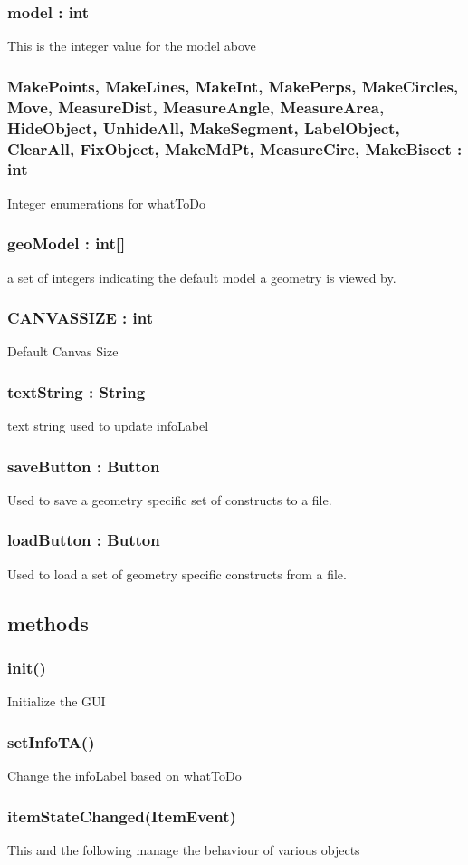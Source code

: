 \documentclass[a4paper,10pt]{report}
\begin{document}
\subsubsection{model : int} This is the integer value for the model above
\subsubsection{MakePoints, MakeLines, MakeInt, MakePerps, MakeCircles, Move, MeasureDist, MeasureAngle, MeasureArea, HideObject, UnhideAll, MakeSegment, LabelObject, ClearAll, FixObject, MakeMdPt, MeasureCirc, MakeBisect : int}
Integer enumerations for whatToDo
\subsubsection{geoModel : int[]} a set of integers indicating the default model a geometry is viewed by.
\subsubsection{CANVASSIZE : int} Default Canvas Size
\subsubsection{textString : String} text string used to update infoLabel
\subsubsection{saveButton : Button} Used to save a geometry specific set of constructs to a file.
\subsubsection{loadButton : Button} Used to load a set of geometry specific constructs from a file.

\subsection{methods}

 \subsubsection{init()} Initialize the GUI
\subsubsection{setInfoTA()} Change the infoLabel based on whatToDo
\subsubsection{itemStateChanged(ItemEvent)} This and the following manage the behaviour of various objects
\end{document}
